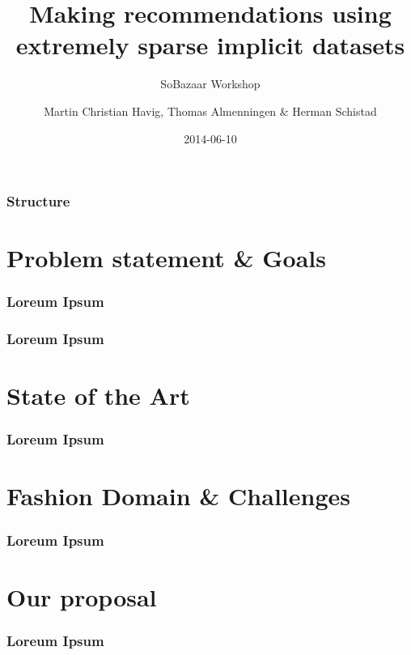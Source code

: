 \documentclass{beamer}
\title{Making recommendations using extremely sparse
       implicit datasets}
\subtitle{SoBazaar Workshop}
\date{2014-06-10}
\author{Martin Christian Havig, Thomas Almenningen \& Herman Schistad}
\begin{document}
  \begin{frame}
    \titlepage
  \end{frame}

  \begin{frame}
    \frametitle{Structure}
    \tableofcontents
  \end{frame}

  \section{Problem statement \& Goals}

  \begin{frame}
    \frametitle{Loreum Ipsum}
  \end{frame}

  \begin{frame}
    \frametitle{Loreum Ipsum}
  \end{frame}
  
  \section{State of the Art}

  \begin{frame}
    \frametitle{Loreum Ipsum}
  \end{frame}

  \section{Fashion Domain \& Challenges}

  \begin{frame}
    \frametitle{Loreum Ipsum}
  \end{frame}

  \section{Our proposal}

  \begin{frame}
    \frametitle{Loreum Ipsum}
  \end{frame}
\end{document}

